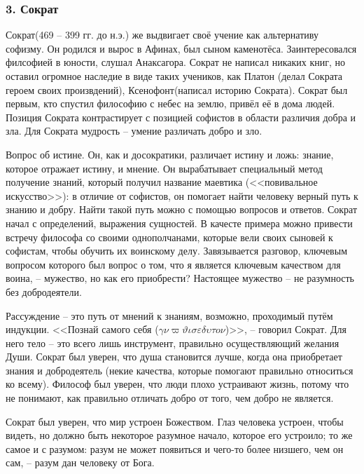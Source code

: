 \documentclass[a4paper, 12pt]{article} %
\begin{document}
\subsubsection*{3. Сократ}

Сократ(469 -- 399 гг. до н.э.) же выдвигает своё учение как альтернативу софизму. Он родился и вырос в Афинах, был сыном каменотёса. Заинтересовался филсофией в юности, слушал Анаксагора. Сократ не написал никаких книг, но оставил огромное наследие в виде таких учеников, как Платон (делал Сократа героем своих произвдений), Ксенофонт(написал историю Сократа). Сократ был первым, кто спустил философию с небес на землю, привёл её в дома людей. Позиция Сократа контрастирует с позицией софистов в области различия добра и зла. Для Сократа мудрость -- умение различать добро и зло. 

Вопрос об истине. Он, как и досократики, различает истину и ложь: знание, которое отражает истину, и мнение. Он вырабатывает специальный метод получение знаний, который получил название маевтика (<<повивальное искусство>>): в отличие от софистов, он помогает найти человеку верный путь к знанию и добру. Найти такой путь можно с помощью вопросов и ответов. Сократ начал с определений, выражения сущностей. В качесте примера можно привести встречу философа со своими однополчанами, которые вели своих сыновей к софистам, чтобы обучить их воинскому делу. Завязывается разговор, ключевым вопросом которого был вопрос о том, что я является ключевым качеством для воина, -- мужество, но как его приобрести? Настоящее мужество -- не разумность без добродеятели.

Рассуждение -- это путь от мнений к знаниям, возможно, проходимый путём индукции. <<Познай самого себя ($\gamma \nu \varpi \vartheta \iota \sigma \varepsilon \delta \upsilon \tau o \nu$)>>, -- говорил Сократ. Для него тело -- это всего лишь инструмент, правильно осуществляющий желания Души. Сократ был уверен, что душа становится лучше, когда она приобретает знания и добродеятель (некие качества, которые помогают правильно относиться ко всему). Философ был уверен, что люди плохо устраивают жизнь, потому что не понимают, как правильно отличать добро от того, чем добро не является.

Сократ был уверен, что мир устроен Божеством. Глаз человека устроен, чтобы видеть, но должно быть некоторое разумное начало, которое его устроило; то же самое и с разумом: разум не может появиться и чего-то более низшего, чем он сам, -- разум дан человеку от Бога.
\end{document}
